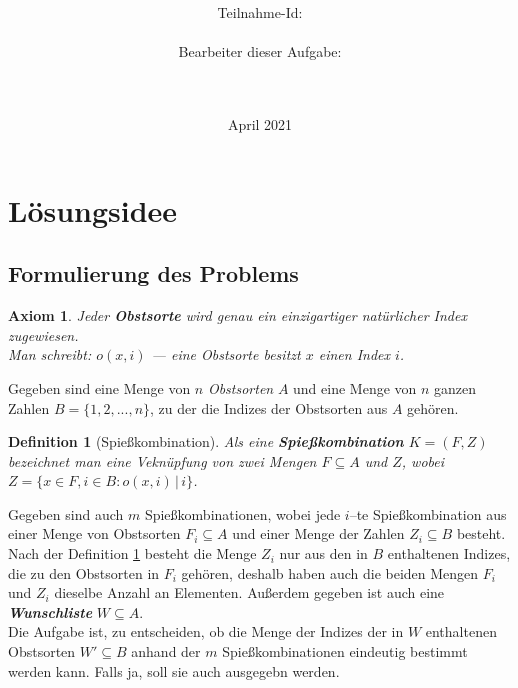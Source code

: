 \documentclass[a4paper,10pt,ngerman]{scrartcl}
\title{\textbf{\Huge\Aufgabe}}
\author{\LARGE Teilnahme-Id: \LARGE \TeilnahmeId \\\\
	    \LARGE Bearbeiter dieser Aufgabe: \\ 
	    \LARGE \Namen\\\\}
\date{\LARGE April 2021}
\newtheorem{definition}{Definition}
\newtheorem{axiom}{Axiom}
\begin{document}
\maketitle
\tableofcontents

\vspace{0.5cm}

\section{Lösungsidee}
\subsection{Formulierung des Problems}
\begin{axiom}\label{ax:obstsorte-index}
Jeder \textbf{Obstsorte} wird genau ein einzigartiger natürlicher Index zugewiesen.\\
Man schreibt: $o(x, i)$ --- eine Obstsorte besitzt $x$ einen Index $i$.
\end{axiom}

Gegeben sind eine Menge von $n$ \textit{Obstsorten} $A$ und eine Menge von $n$ ganzen Zahlen
$B = \{1, 2, ..., n\}$, zu der die Indizes der Obstsorten aus $A$ gehören.

\begin{definition}[Spießkombination]\label{def:spiesskomb}
Als eine \textbf{Spießkombination} $K = (F, Z)$ bezeichnet man eine Veknüpfung von zwei Mengen 
$F \subseteq A$ und $Z$, wobei $Z = \{x \in F, i \in B : o(x, i)\, |\, i\}$.
\end{definition}

Gegeben sind auch $m$ Spießkombinationen, wobei jede $i$--te Spießkombination
aus einer Menge von Obstsorten $F_i \subseteq A$ und einer Menge der Zahlen $Z_i \subseteq B$ besteht. 
Nach der Definition \ref{def:spiesskomb} besteht die Menge $Z_i$ nur aus
den in $B$ enthaltenen Indizes, die zu den Obstsorten in $F_i$ gehören, deshalb haben auch die beiden Mengen
$F_i$ und $Z_i$ dieselbe Anzahl an Elementen.
Außerdem gegeben ist auch eine \textit{\textbf{Wunschliste}} $W \subseteq A$.\\

Die Aufgabe ist, zu entscheiden,
ob die Menge der Indizes der in $W$ enthaltenen Obstsorten $W' \subseteq B$ anhand der $m$ 
Spießkombinationen eindeutig bestimmt werden kann. Falls ja, soll sie auch ausgegebn werden.
\end{document}

